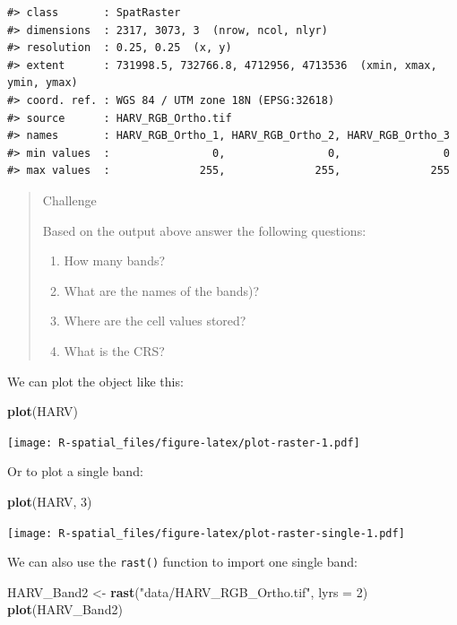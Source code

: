 \documentclass[
]{book}
\newenvironment{Shaded}{\begin{snugshade}}{\end{snugshade}}
\newcommand{\AttributeTok}[1]{\textcolor[rgb]{0.13,0.29,0.53}{#1}}
\newcommand{\DecValTok}[1]{\textcolor[rgb]{0.00,0.00,0.81}{#1}}
\newcommand{\FunctionTok}[1]{\textcolor[rgb]{0.13,0.29,0.53}{\textbf{#1}}}
\newcommand{\NormalTok}[1]{#1}
\newcommand{\OtherTok}[1]{\textcolor[rgb]{0.56,0.35,0.01}{#1}}
\newcommand{\StringTok}[1]{\textcolor[rgb]{0.31,0.60,0.02}{#1}}
\providecommand{\tightlist}{%
  \setlength{\itemsep}{0pt}\setlength{\parskip}{0pt}}
\begin{document}
\begin{verbatim}
#> class       : SpatRaster 
#> dimensions  : 2317, 3073, 3  (nrow, ncol, nlyr)
#> resolution  : 0.25, 0.25  (x, y)
#> extent      : 731998.5, 732766.8, 4712956, 4713536  (xmin, xmax, ymin, ymax)
#> coord. ref. : WGS 84 / UTM zone 18N (EPSG:32618) 
#> source      : HARV_RGB_Ortho.tif 
#> names       : HARV_RGB_Ortho_1, HARV_RGB_Ortho_2, HARV_RGB_Ortho_3 
#> min values  :                0,                0,                0 
#> max values  :              255,              255,              255
\end{verbatim}

\begin{quote}
Challenge

Based on the output above answer the following questions:

\begin{enumerate}
\def\labelenumi{\arabic{enumi}.}
\tightlist
\item
  How many bands?
\item
  What are the names of the bands)?
\item
  Where are the cell values stored?
\item
  What is the CRS?
\end{enumerate}
\end{quote}

We can plot the object like this:

\begin{Shaded}
\begin{Highlighting}[]
\FunctionTok{plot}\NormalTok{(HARV)}
\end{Highlighting}
\end{Shaded}

\texttt{[image: R-spatial\_files/figure-latex/plot-raster-1.pdf]}

Or to plot a single band:

\begin{Shaded}
\begin{Highlighting}[]
\FunctionTok{plot}\NormalTok{(HARV, }\DecValTok{3}\NormalTok{)}
\end{Highlighting}
\end{Shaded}

\texttt{[image: R-spatial\_files/figure-latex/plot-raster-single-1.pdf]}

We can also use the \texttt{rast()} function to import one single band:

\begin{Shaded}
\begin{Highlighting}[]
\NormalTok{HARV\_Band2 }\OtherTok{\textless{}{-}} \FunctionTok{rast}\NormalTok{(}\StringTok{"data/HARV\_RGB\_Ortho.tif"}\NormalTok{, }\AttributeTok{lyrs =} \DecValTok{2}\NormalTok{)}
\FunctionTok{plot}\NormalTok{(HARV\_Band2)}
\end{Highlighting}
\end{Shaded}
\end{document}
